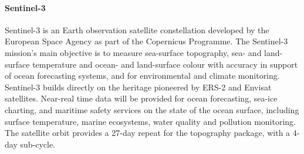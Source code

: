 \paragraph{Sentinel-3}
Sentinel-3 is an Earth observation satellite constellation developed by the European Space Agency as part of the Copernicus Programme. The Sentinel-3 mission's main objective is to measure sea-surface topography, sea- and land-surface temperature and ocean- and land-surface colour with accuracy in support of ocean forecasting systems, and for environmental and climate monitoring. Sentinel-3 builds directly on the heritage pioneered by ERS-2 and Envisat satellites. Near-real time data will be provided for ocean forecasting, sea-ice charting, and maritime safety services on the state of the ocean surface, including surface temperature, marine ecosystems, water quality and pollution monitoring. The satellite orbit provides a 27-day repeat for the topography package, with a 4-day sub-cycle.
\clearpage
